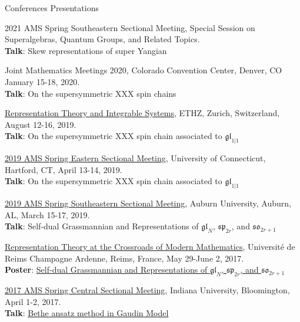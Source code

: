\documentclass{resume} %
\begin{document}
\begin{rSection}{Conferences Presentations}
\begin{rSubsection}{}{}
{}{}
  \item {2021 AMS Spring Southeastern Sectional Meeting, Special Session on Superalgebras, Quantum Groups, and Related Topics.\\
      \textbf{Talk}: Skew representations of super Yangian}\\
  \item {Joint Mathematics Meetings 2020, Colorado Convention Center, Denver, CO January 15-18, 2020.\\
        \textbf{Talk}: On the supersymmetric XXX spin chains}\\
  \item {\href{http://rtis2019.math.iupui.edu/}{Representation Theory and Integrable Systems}, ETHZ, Zurich, Switzerland, August 12-16, 2019. \\
		{\bf Talk}: On the supersymmetric XXX spin chain associated to $\mathfrak{gl}_{1|1}$}\\
  \item {\href{http://www.ams.org/meetings/sectional/2265_program.html}{2019 AMS Spring Eastern Sectional Meeting}, University of Connecticut, Hartford, CT, April 13-14, 2019. \\
        {\bf Talk}: On the supersymmetric XXX spin chain associated to $\mathfrak{gl}_{1|1}$}\\
  \item {\href{http://www.ams.org/meetings/sectional/2261_program.html}{2019 AMS Spring Southeastern Sectional Meeting}, Auburn University, Auburn, AL, March 15-17, 2019. \\
        {\bf Talk}: Self-dual Grassmannian and Representations of $\mathfrak{gl}_N$, $\mathfrak{sp}_{2r}$, and $\mathfrak{so}_{2r+1}$}\\
  \item {\href{http://reims.math.cnrs.fr/pevzner/aak81.html}{Representation Theory at the Crossroads of Modern Mathematics}, Universit\'{e} de Reims Champagne Ardenne, Reims, France, May 29-June 2, 2017. \\
		{\bf Poster}: \href{https://kanglu.me/writings/poster-Reims.pdf}{Self-dual Grassmannian and Representations of $\mathfrak{gl}_N$, $\mathfrak{sp}_{2r}$, and $\mathfrak{so}_{2r+1}$}}\\
  \item {\href{http://www.ams.org/meetings/sectional/2233_program.html}{2017 AMS Spring Central Sectional Meeting}, Indiana University, Bloomington, April 1-2, 2017. \\
		{\bf Talk}: \href{https://kanglu.me/writings/ams-sec-2017.pdf}{Bethe ansatz method in Gaudin Model}}\\
\end{rSubsection}
\end{rSection}
\end{document}

